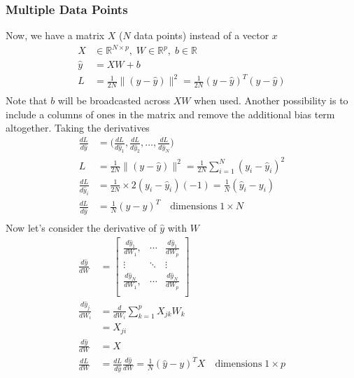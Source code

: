 \documentclass[../../deep_learning_notes.tex]{subfiles}
\begin{document}
\subsubsection*{Multiple Data Points}
Now, we have a matrix $X$ ($N$ data points) instead of a vector $x$
\begin{align*}
    X &\in \mathbb{R}^{N \times p}, \; W \in \mathbb{R}^{p}, \; b \in \mathbb{R}\\
    \hat{y} &= XW + b\\
    L &= \frac{1}{2N}\lVert (y - \hat{y}) \rVert^{2}
    = \frac{1}{2N}(y - \hat{y})^{T}(y - \hat{y})\\
\end{align*}
Note that $b$ will be broadcasted across $XW$ when used. Another possibility is to include a columns of ones in the matrix and remove the additional bias term altogether. Taking the derivatives
\begin{align*}
    \frac{dL}{d\hat{y}} &= \big( \frac{dL}{d\hat{y}_1}, \frac{dL}{d\hat{y}_2}, \ldots, \frac{dL}{d\hat{y}_N} \big)\\
    L &= \frac{1}{2N}\lVert (y - \hat{y}) \rVert^{2} = \frac{1}{2N} \sum_{i=1}^{N} (y_{i} - \hat{y}_{i})^{2}\\
    \frac{dL}{d\hat{y}_{i}} &= \frac{1}{2N} \times 2(y_{i} - \hat{y}_{i})(-1)
    = \frac{1}{N}(\hat{y}_{i} - y_{i})\\
    \frac{dL}{d\hat{y}} &= \frac{1}{N}(\hat{y} - y)^{T} \quad \text{dimensions}\; 1 \times N\\
\end{align*}
Now let's consider the derivative of $\hat{y}$ with $W$
\begin{align*}
    \frac{d\hat{y}}{dW} &= \begin{bmatrix}
        \frac{d\hat{y}_{1}}{dW_{1}}, &\cdots &\frac{d\hat{y}_{1}}{dW_{p}}\\
        \vdots &\ddots &\vdots\\
        \frac{d\hat{y}_{N}}{dW_{1}}, &\cdots &\frac{d\hat{y}_{N}}{dW_{p}}\\
    \end{bmatrix}\\
    \frac{d\hat{y}_{j}}{dW_{i}} &= \frac{d}{dW_{i}}\sum_{k=1}^{p}X_{jk}W_{k}\\
    &= X_{ji}\\
    \frac{d\hat{y}}{dW} &= X\\
    \frac{dL}{dW} &= \frac{dL}{d\hat{y}} \frac{d\hat{y}}{dW}
    = \frac{1}{N}(\hat{y} - y)^{T} X \quad \text{dimensions}\; 1 \times p\\
\end{align*}
\end{document}
